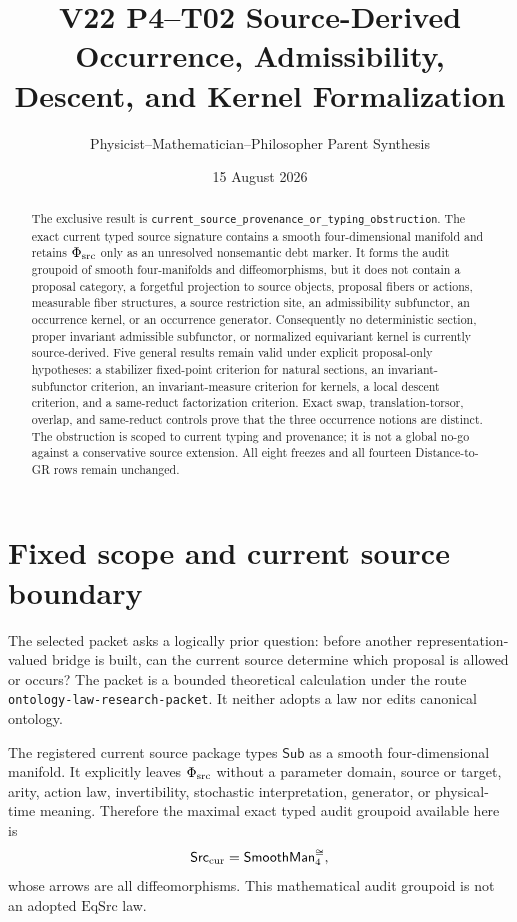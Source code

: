 \documentclass[11pt]{article}
\title{V22 P4--T02 Source-Derived Occurrence, Admissibility,\\
Descent, and Kernel Formalization}
\author{Physicist--Mathematician--Philosopher Parent Synthesis}
\date{15 August 2026}
\newcommand{\Src}{\mathsf{Src}}
\newcommand{\Sub}{\mathsf{Sub}}
\begin{document}
\maketitle

\begin{abstract}
The exclusive result is
\texttt{current\_source\_provenance\_or\_typing\_obstruction}.
The exact current typed source signature contains a smooth four-dimensional
manifold and retains $\Phi_{\rm src}$ only as an unresolved nonsemantic debt
marker.  It forms the audit groupoid of smooth four-manifolds and
diffeomorphisms, but it does not contain a proposal category, a forgetful
projection to source objects, proposal fibers or actions, measurable fiber
structures, a source restriction site, an admissibility subfunctor, an
occurrence kernel, or an occurrence generator.  Consequently no deterministic
section, proper invariant admissible subfunctor, or normalized equivariant
kernel is currently source-derived.  Five general results remain valid under
explicit proposal-only hypotheses: a stabilizer fixed-point criterion for
natural sections, an invariant-subfunctor criterion, an invariant-measure
criterion for kernels, a local descent criterion, and a same-reduct
factorization criterion.  Exact swap, translation-torsor, overlap, and
same-reduct controls prove that the three occurrence notions are distinct.
The obstruction is scoped to current typing and provenance; it is not a global
no-go against a conservative source extension.  All eight freezes and all
fourteen Distance-to-GR rows remain unchanged.
\end{abstract}

\section{Fixed scope and current source boundary}

The selected packet asks a logically prior question: before another
representation-valued bridge is built, can the current source determine which
proposal is allowed or occurs?  The packet is a bounded theoretical
calculation under the route \texttt{ontology-law-research-packet}.  It neither
adopts a law nor edits canonical ontology.

The registered current source package types $\Sub$ as a smooth
four-dimensional manifold.  It explicitly leaves $\Phi_{\rm src}$ without a
parameter domain, source or target, arity, action law, invertibility,
stochastic interpretation, generator, or physical-time meaning.  Therefore
the maximal exact typed audit groupoid available here is
\[
  \Src_{\rm cur}=\mathsf{SmoothMan}_{4}^{\cong},
\]
whose arrows are all diffeomorphisms.  This mathematical audit groupoid is not
an adopted $\mathrm{EqSrc}$ law.
\end{document}
